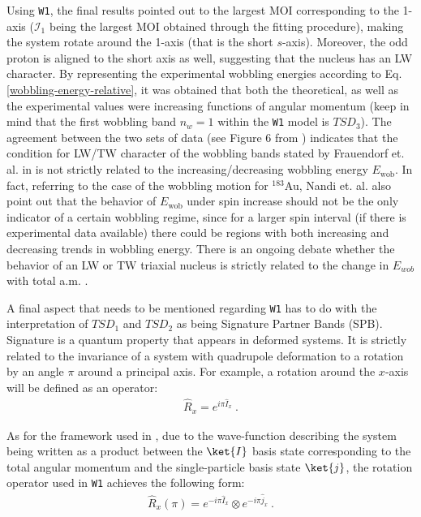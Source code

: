 \documentclass[myclassdoc,debug]{rjparticle}
\begin{document}
Using \texttt{W1}, the final results pointed out to the largest MOI corresponding to the 1-axis ($\mathcal{I}_1$ being the largest MOI obtained through the fitting procedure), making the system rotate around the 1-axis (that is the short $s$-axis). Moreover, the odd proton is aligned to the short axis as well, suggesting that the nucleus has an LW character. By representing the experimental wobbling energies according to Eq. \ref{wobbling-energy-relative}, it was obtained that both the theoretical, as well as the experimental values were increasing functions of angular momentum (keep in mind that the first wobbling band $n_w=1$ within the \texttt{W1} model is $TSD_3$). The agreement between the two sets of data (see Figure 6 from \cite{raduta2020approach}) indicates that the condition for LW/TW character of the wobbling bands stated by Frauendorf et. al. in \cite{frauendorf2014transverse} is not strictly related to the increasing/decreasing wobbling energy $E_\text{wob}$. In fact, referring to the case of the wobbling motion for $^{183}$Au, Nandi et. al. \cite{nandi2020first} also point out that the behavior of $E_\text{wob}$ under spin increase should not be the only indicator of a certain wobbling regime, since for a larger spin interval (if there is experimental data available) there could be regions with both increasing and decreasing trends in wobbling energy. There is an ongoing debate whether the behavior of an LW or TW triaxial nucleus is strictly related to the change in $E_{wob}$ with total a.m. \cite{tanabe2017stability,frauendorf2018comment,tanabe2018reply}.

A final aspect that needs to be mentioned regarding \texttt{W1} has to do with the interpretation of $TSD_1$ and $TSD_2$ as being Signature Partner Bands (SPB). Signature \cite{bohr1998nuclear} is a quantum property that appears in deformed systems. It is strictly related to the invariance of a system with quadrupole deformation to a rotation by an angle $\pi$ around a principal axis. For example, a rotation around the $x$-axis will be defined as an operator:
\begin{align}
    \hat{R}_x=e^{i\pi\hat{I}_x}\ .
\end{align}

As for the framework used in \cite{raduta2020approach,raduta2020towards}, due to the wave-function describing the system being written as a product between the $\ket{I}$ basis state corresponding to the total angular momentum and the single-particle basis state $\ket{j}$, the rotation operator used in \texttt{W1} achieves the following form:
\begin{align}
    \hat{R}_x(\pi)=e^{-i\pi\hat{I}_x}\otimes e^{-i\pi\hat{j}_x}\ .
\end{align}
\end{document}
